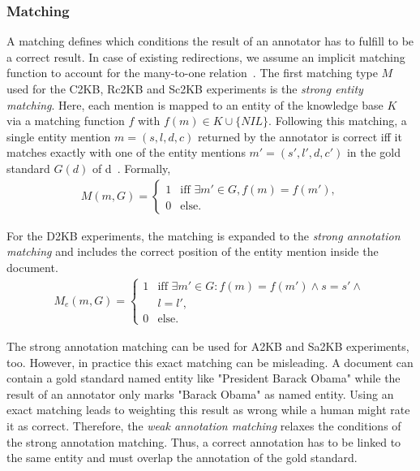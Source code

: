 
\subsubsection{Matching}

A matching defines which conditions the result of an annotator has to fulfill to be a correct result.
In case of existing redirections, we assume an implicit matching function to account for the many-to-one relation~\cite{cornolti}.
The first matching type $M$ used for the C2KB, Rc2KB and Sc2KB experiments is the \textit{strong entity matching}.
Here, each mention is mapped to an entity of the knowledge base $K$ via a matching function $f$ with $f(m) \in K \cup \{NIL\}$.
Following this matching, a single entity mention $m = (s, l, d, c)$ returned by the annotator is correct iff it matches exactly with one of the entity mentions $m' = (s', l', d, c')$ in the gold standard $G(d)$ of d~\cite{cornolti}. Formally,
\begin{align}
M(m,G)=
\begin{cases}
1 &  \text{iff }\exists m' \in G, f(m) = f(m'), \\
0 & \text{else.}
\end{cases}
\end{align}

For the D2KB experiments, the matching is expanded to the \textit{strong annotation matching} and includes the correct position of the entity mention inside the document.
\begin{align}
M_e(m,G) =
\begin{cases}
1 &  \text{iff }\exists m' \in G: f(m) = f(m') \wedge s = s' \wedge \\
  &l = l', \\
0 & \text{else.}
\end{cases}
\end{align}

The strong annotation matching can be used for A2KB and Sa2KB experiments, too.
However, in practice this exact matching can be misleading.
A document can contain a gold standard named entity like "President Barack Obama" while the result of an annotator only marks "Barack Obama" as named entity.
Using an exact matching leads to weighting this result as wrong while a human might rate it as correct.
Therefore, the \textit{weak annotation matching} relaxes the conditions of the strong annotation matching.
Thus, a correct annotation has to be linked to the same entity and must overlap the annotation of the gold standard.

